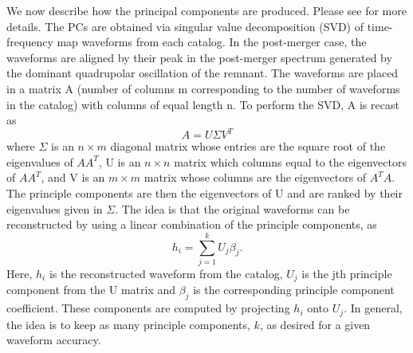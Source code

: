 \documentclass[prd,showpacs,superscriptaddress,twocolumn,
floatfix,preprintnumbers,altaffilletter]{revtex4}
\begin{document}
We now describe how the principal components are produced. Please see \cite{ClEA2015} for more details.
The PCs are obtained via singular value decomposition (SVD) of time-frequency map waveforms from each catalog. 
In the post-merger case, the waveforms are aligned by their peak in the post-merger spectrum generated by the dominant quadrupolar oscillation of the remnant.
The waveforms are placed in a matrix A (number of columns m corresponding to the number of waveforms in the catalog) with columns of equal length n.
To perform the SVD, A is recast as
\begin{equation}
A = U \Sigma V^T
\end{equation}
where $\Sigma$ is an $n \times m$ diagonal matrix whose entries are the square root of the eigenvalues of $A A^T$, U is an $n \times n$ matrix which columns equal to the eigenvectors of $A A^T$, and V is an $m \times m$ matrix whose columns are the eigenvectors of $A^T A$.
The principle components are then the eigenvectors of U and are ranked by their eigenvalues given in $\Sigma$.
The idea is that the original waveforms can be reconstructed by using a linear combination of the principle components, as
\begin{equation}
h_i = \sum_{j=1}^k U_j \beta_j.
\end{equation}
Here, $h_i$ is the reconstructed waveform from the catalog, $U_j$ is the jth principle component from the U matrix and $\beta_j$ is the corresponding principle component coefficient.
These components are computed by projecting $h_i$ onto $U_j$.
In general, the idea is to keep as many principle components, $k$, as desired for a given waveform accuracy.
\end{document}
